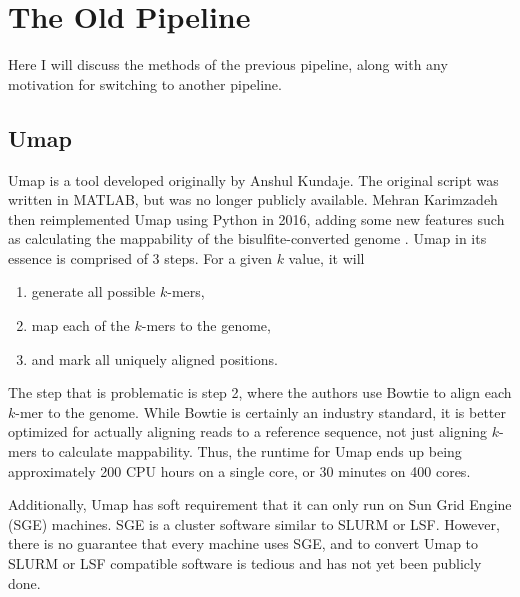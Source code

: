 \documentclass[a4paper]{article}
\begin{document}
  \section{The Old Pipeline}
  Here I will discuss the methods of the previous pipeline, along with any motivation for switching to another pipeline.

    \subsection{Umap}
    Umap is a tool developed originally by Anshul Kundaje. The original script was written in MATLAB, but was no longer
    publicly available. Mehran Karimzadeh then reimplemented Umap using Python in 2016, adding some new features such as
    calculating the mappability of the bisulfite-converted genome \cite{karimzadeh_umap_2018}. Umap in its essence is
    comprised of 3 steps. For a given $k$ value, it will
    \begin{enumerate}
      \item generate all possible $k$-mers,
      \item map each of the $k$-mers to the genome,
      \item and mark all uniquely aligned positions.
    \end{enumerate}
    The step that is problematic is step 2, where the authors use Bowtie \cite{langmead_ultrafast_2009} to align each $k$-mer to the genome.
    While Bowtie is certainly an industry standard, it is better optimized for actually aligning reads to a reference
    sequence, not just aligning $k$-mers to calculate mappability. Thus, the runtime for Umap ends up being approximately
    200 CPU hours on a single core, or 30 minutes on 400 cores.

    Additionally, Umap has soft requirement that it can only run on Sun Grid Engine (SGE) machines. SGE is a cluster
    software similar to SLURM or LSF. However, there is no guarantee that every machine uses SGE, and to convert Umap to
    SLURM or LSF compatible software is tedious and has not yet been publicly done.
\end{document}
